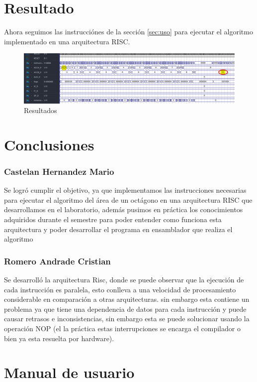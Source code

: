 \documentclass{IEEEtran}
\begin{document}
\section{Resultado}
\label{sec:orgcc271b6}
Ahora seguimos las instrucciónes de la sección \ref{sec:uso} para ejecutar el algoritmo implementado en una arquitectura RISC.
\begin{figure}[htbp]
\centering
\includegraphics[width=.9\linewidth]{../img/7.png}
\caption{Resultados}
\end{figure}
\section{Conclusiones}
\label{sec:orga38d001}
\subsubsection{Castelan Hernandez Mario}
\label{sec:org31c4259}
Se logró cumplir el objetivo, ya que implementamos las instrucciones necesarias para ejecutar el algoritmo del área de un octágono en una arquitectura RISC que desarrollamos en el laboratorio, además pusimos en práctica los conocimientos adquiridos durante el semestre para poder entender como funciona esta arquitectura y poder desarrollar el programa en ensamblador que realiza el algoritmo
\subsubsection{Romero Andrade Cristian}
\label{sec:org13c4ec7}
Se desarrolló la arquitectura Risc, donde se puede observar que la ejecución de cada instrucción es paralela, esto conlleva a una velocidad de procesamiento considerable en comparación a otras arquitecturas. sin embargo esta contiene un problema ya que tiene una dependencia de datos para cada instrucción y puede causar retrasos e inconsistencias, sin embargo esta se puede solucionar usando la operación NOP (el la práctica estas interrupciones se encarga el compilador o bien ya esta resuelta por hardware).
\section{Manual de usuario}
\label{sec:org2f4f6ab}
\end{document}
